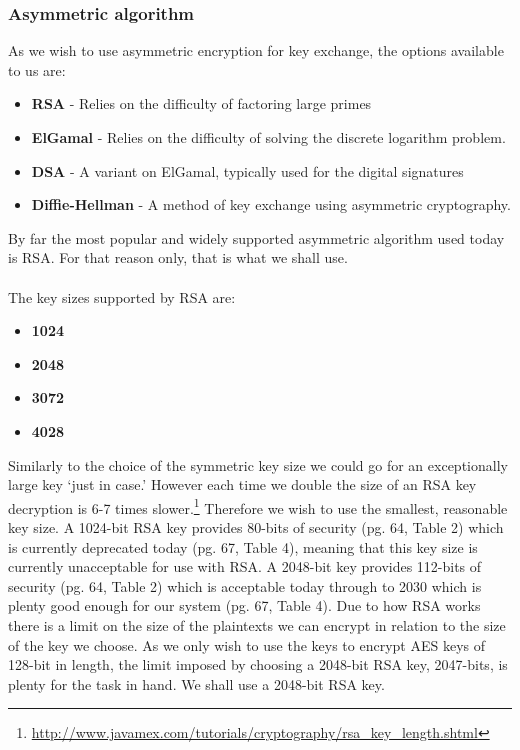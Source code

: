 \documentclass[12pt, titlepage]{article}
\begin{document}
\subsubsection{Asymmetric algorithm}
As we wish to use asymmetric encryption for key exchange, the options available to us are:
\begin{itemize}
	\item \textbf{RSA} - Relies on the difficulty of factoring large primes
	\item \textbf{ElGamal} - Relies on the difficulty of solving the discrete logarithm problem.
	\item \textbf{DSA} - A variant on ElGamal, typically used for the digital signatures
	\item \textbf{Diffie-Hellman} - A method of key exchange using asymmetric cryptography.
\end{itemize}
By far the most popular and widely supported asymmetric algorithm used today is RSA. For that reason only, that is what we shall use.
\\
\\
The key sizes supported by RSA are:
\begin{itemize}
	\item \textbf{1024}
	\item \textbf{2048}
	\item \textbf{3072}
	\item \textbf{4028}
\end{itemize}
Similarly to the choice of the symmetric key size we could go for an exceptionally large key `just in case.' However each time we double the size of an RSA key decryption is 6-7 times slower.\footnote{\url{http://www.javamex.com/tutorials/cryptography/rsa_key_length.shtml}}
Therefore we wish to use the smallest, reasonable key size. A 1024-bit RSA key provides 80-bits of security (pg. 64, Table 2) which is currently deprecated today (pg. 67, Table 4), meaning that this key size is currently unacceptable for use with RSA. A 2048-bit key provides 112-bits of security (pg. 64, Table 2) which is acceptable today through to 2030 which is plenty good enough for our system (pg. 67, Table 4).\cite{nistKeys}
\newline \indent Due to how RSA works there is a limit on the size of the plaintexts we can encrypt in relation to the size of the key we choose. As we only wish to use the keys to encrypt AES keys of 128-bit in length, the limit imposed by choosing a 2048-bit RSA key, 2047-bits, is plenty for the task in hand.
\newline We shall use a 2048-bit RSA key.
\end{document}
